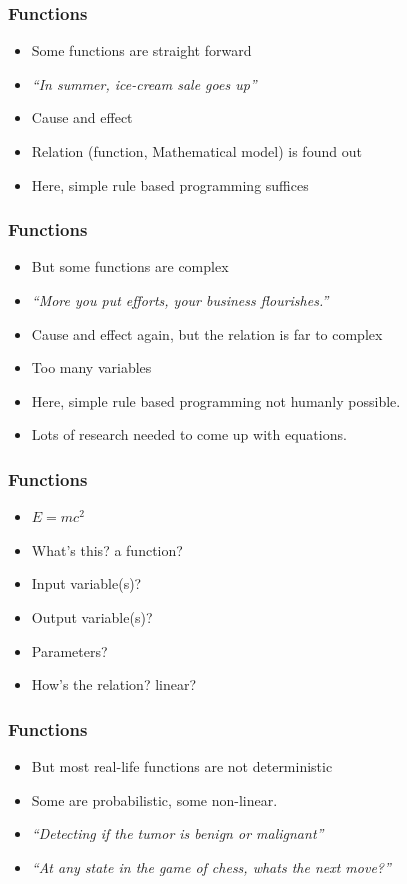 \begin{frame}[fragile]\frametitle{Functions}
\begin{itemize}
\item Some functions are straight forward
\item {\em ``In summer, ice-cream sale goes up''}
\item Cause and effect
\item Relation (function, Mathematical model) is found out
\item Here, simple rule based programming suffices
\end{itemize}
\end{frame}

\begin{frame}[fragile]\frametitle{Functions}
\begin{itemize}
\item But some functions are complex
\item {\em ``More you put efforts, your business flourishes.''}
\item Cause and effect again, but the relation is far to complex
\item Too many variables
\item Here, simple rule based programming not humanly possible.
\item Lots of research needed to come up with equations.
\end{itemize}
\end{frame}

\begin{frame}[fragile]\frametitle{Functions}
\begin{itemize}
\item $E = mc^2$
\item What's this? a function?
\item Input variable(s)?
\item Output variable(s)?
\item Parameters?
\item How's the relation? linear?
\end{itemize}
\end{frame}



\begin{frame}[fragile]\frametitle{Functions}
\begin{itemize}
\item But most real-life functions are not deterministic
\item Some are probabilistic, some non-linear.
\item {\em ``Detecting if the tumor is benign or malignant''}
\item {\em ``At any state in the game of chess, whats the next move?''}
\end{itemize}
\end{frame}


